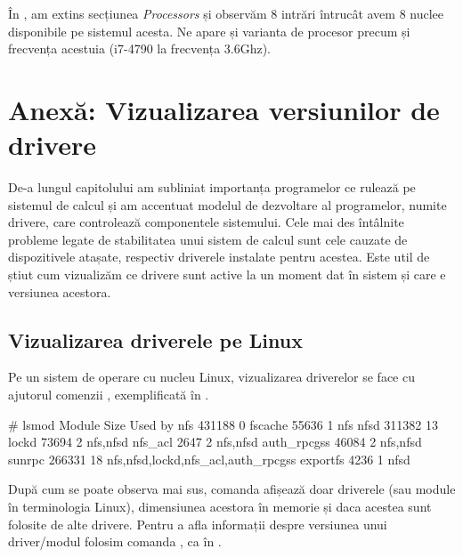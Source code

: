 În , am extins secțiunea
\textit{Processors} și observăm 8 intrări întrucât avem 8 nuclee disponibile pe
sistemul acesta. Ne apare și varianta de procesor precum și frecvența acestuia
(i7-4790 la frecvența 3.6Ghz).

\section{Anexă: Vizualizarea versiunilor de drivere}
\label{sec:hardware-virtualizare-driver}

De-a lungul capitolului am subliniat importanța programelor ce rulează pe
sistemul de calcul și am accentuat modelul de dezvoltare al programelor, numite
drivere, care controlează componentele sistemului. Cele mai des întâlnite
probleme legate de stabilitatea unui sistem de calcul sunt cele cauzate de
dispozitivele atașate, respectiv driverele instalate pentru acestea. Este util
de știut cum vizualizăm ce drivere sunt active la un moment dat în sistem și
care e versiunea acestora.

\subsection{Vizualizarea driverele pe Linux}
\label{sec:hardware-virtualizare-linux}

Pe un sistem de operare cu nucleu Linux, vizualizarea driverelor se face cu
ajutorul comenzii , exemplificată în .

\begin{screen}# lsmod
Module                  Size  Used by
nfs                   431188  0
fscache                55636  1 nfs
nfsd                  311382  13
lockd                  73694  2 nfs,nfsd
nfs_acl                 2647  2 nfs,nfsd
auth_rpcgss            46084  2 nfs,nfsd
sunrpc                266331  18 nfs,nfsd,lockd,nfs_acl,auth_rpcgss
exportfs                4236  1 nfsd
\end{screen}


După cum se poate observa mai sus, comanda  afișează doar driverele (sau
module în terminologia Linux), dimensiunea acestora în memorie și daca acestea
sunt folosite de alte drivere. Pentru a afla informații despre versiunea unui
driver/modul folosim comanda , ca în .

